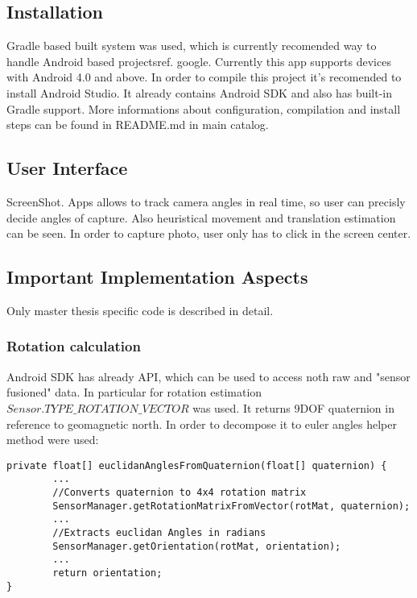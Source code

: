 \subsection{Installation}
Gradle based built system was used, which is currently recomended way to handle Android based projects{ref. google}. Currently this app supports devices with Android 4.0 and above. In order to compile this project it's recomended to install Android Studio. It already contains Android SDK and also has built-in Gradle support.
More informations about configuration, compilation and install steps can be found in README.md in main catalog. 
\subsection{User Interface}
ScreenShot.
Apps allows to track camera angles in real time, so user can precisly decide angles of capture. Also heuristical movement and translation estimation can be seen. In order to capture photo, user only has to click in the screen center.
\subsection{Important Implementation Aspects}
Only master thesis specific code is described in detail.
\subsubsection{Rotation calculation}
Android SDK has already API, which can be used to access noth raw and "sensor fusioned" data. In particular for rotation estimation $Sensor.TYPE\_ROTATION\_VECTOR$  
was used. It returns 9DOF quaternion in reference to geomagnetic north. In order to decompose it to euler angles helper method were used:
\lstset{escapechar=@,style=customjava}
\begin{lstlisting}
private float[] euclidanAnglesFromQuaternion(float[] quaternion) {
        ...
        //Converts quaternion to 4x4 rotation matrix
        SensorManager.getRotationMatrixFromVector(rotMat, quaternion);
        ...
        //Extracts euclidan Angles in radians
        SensorManager.getOrientation(rotMat, orientation);
        ...
        return orientation;
}
\end{lstlisting}
